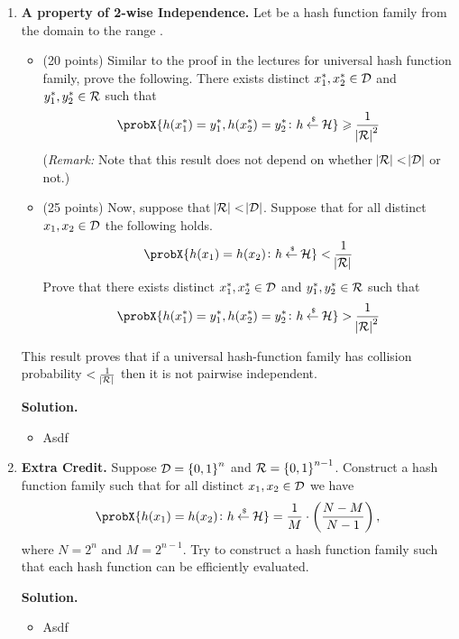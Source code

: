 \documentclass[11pt]{article}
\newcommand{\nextoddpage}{\checkoddpage\ifoddpage{\ \newpage\ \newpage}\else{\ \newpage}\fi}
\begin{document}
\begin{enumerate}
\nextoddpage 
\item {\bfseries A property of 2-wise Independence.} 
  Let \cH be a hash function family from the domain \cD to the range \cR. 
  \begin{itemize}
  \item (20 points) Similar to the proof in the lectures for universal hash function family, prove the following. 
    There exists distinct $x_1^*,x_2^*\in{\mathcal D}$ and $y_1^*,y_2^*\in{\mathcal R}$ such that 
      $$\probX{h(x^*_1)=y^*_1,h(x^*_2)=y^*_2\colon h\getsr\cH} \geq \frac1{\abs\cR^2}$$
    ({\em Remark:} Note that this result does not depend on whether $\abs{{\mathcal R}} < \abs{{\mathcal D}}$ or not.) 
  \item (25 points) Now, suppose that $\abs{{\mathcal R}} < \abs{{\mathcal D}}$. 
    Suppose that for all distinct $x_1,x_2\in{\mathcal D}$ the following holds.  
    $$\probX{h(x_1)=h(x_2)\colon h\getsr\cH} < \frac1{\abs\cR}$$
    Prove that there exists distinct $x_1^*,x_2^*\in{\mathcal D}$ and $y_1^*,y_2^*\in{\mathcal R}$ such that 
      $$\probX{h(x^*_1)=y^*_1,h(x^*_2)=y^*_2\colon h\getsr\cH} > \frac1{\abs\cR^2}$$
  \end{itemize}
  This result proves that if a universal hash-function family has collision probability $<\frac1{\abs{{\mathcal R}}}$ then it is not pairwise independent. 
  
  {\bfseries Solution.} 
  \begin{itemize} 
  \item Asdf
  \end{itemize}



\nextoddpage 
\item {\bfseries Extra Credit.} 
  Suppose ${\mathcal D}={\{0,1\}}^n$ and ${\mathcal R}={\{0,1\}}^{n-1}$. 
  Construct a hash function family such that for all distinct $x_1,x_2\in{\mathcal D}$ we have 
  $$\probX{h(x_1)=h(x_2)\colon h\getsr\cH} = \frac1M \cdot\left(\frac{N-M}{N-1}\right),$$
  where $N=2^n$ and $M=2^{n-1}$.  
  Try to construct a hash function family such that each hash function can be efficiently evaluated. 
  
  {\bfseries Solution.} 
  \begin{itemize} 
  \item Asdf
  \end{itemize}
 



\end{enumerate}
\end{document}
